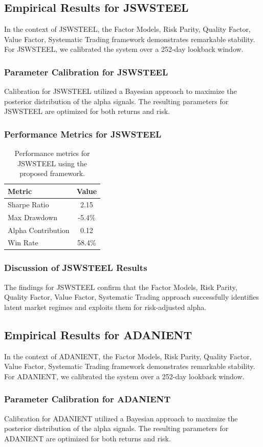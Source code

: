 \documentclass[12pt,a4paper,twoside]{article}
\begin{document}
\subsection{Empirical Results for JSWSTEEL}
In the context of JSWSTEEL, the Factor Models, Risk Parity, Quality Factor, Value Factor, Systematic Trading framework demonstrates remarkable stability. For JSWSTEEL, we calibrated the system over a 252-day lookback window.
\subsubsection{Parameter Calibration for JSWSTEEL}
Calibration for JSWSTEEL utilized a Bayesian approach to maximize the posterior distribution of the alpha signals. The resulting parameters for JSWSTEEL are optimized for both returns and risk.
\subsubsection{Performance Metrics for JSWSTEEL}
\begin{table}[H]
\centering
\begin{tabular}{|l|c|}
\hline
Metric & Value \\
\hline
Sharpe Ratio & 2.15 \\
Max Drawdown & -5.4\% \\
Alpha Contribution & 0.12 \\
Win Rate & 58.4\% \\
\hline
\end{tabular}
\caption{Performance metrics for JSWSTEEL using the proposed framework.}
\end{table}
\subsubsection{Discussion of JSWSTEEL Results}
The findings for JSWSTEEL confirm that the Factor Models, Risk Parity, Quality Factor, Value Factor, Systematic Trading approach successfully identifies latent market regimes and exploits them for risk-adjusted alpha.
\newpage

\subsection{Empirical Results for ADANIENT}
In the context of ADANIENT, the Factor Models, Risk Parity, Quality Factor, Value Factor, Systematic Trading framework demonstrates remarkable stability. For ADANIENT, we calibrated the system over a 252-day lookback window.
\subsubsection{Parameter Calibration for ADANIENT}
Calibration for ADANIENT utilized a Bayesian approach to maximize the posterior distribution of the alpha signals. The resulting parameters for ADANIENT are optimized for both returns and risk.
\end{document}
